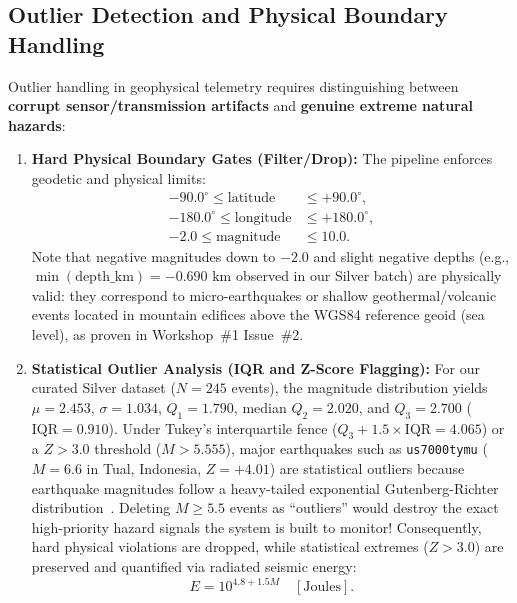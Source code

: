 \subsection{Outlier Detection and Physical Boundary Handling}
Outlier handling in geophysical telemetry requires distinguishing between \textbf{corrupt sensor/transmission artifacts} and \textbf{genuine extreme natural hazards}:
\begin{enumerate}
    \item \textbf{Hard Physical Boundary Gates (Filter/Drop):} The pipeline enforces geodetic and physical limits:
    \begin{align}
        -90.0^\circ \le \text{latitude} &\le +90.0^\circ, \\
        -180.0^\circ \le \text{longitude} &\le +180.0^\circ, \\
        -2.0 \le \text{magnitude} &\le 10.0.
    \end{align}
    Note that negative magnitudes down to $-2.0$ and slight negative depths (e.g., $\min(\text{depth\_km}) = -0.690\text{ km}$ observed in our Silver batch) are physically valid: they correspond to micro-earthquakes or shallow geothermal/volcanic events located in mountain edifices above the WGS84 reference geoid (sea level), as proven in Workshop~\#1 Issue~\#2.
    \item \textbf{Statistical Outlier Analysis (IQR and Z-Score Flagging):} For our curated Silver dataset ($N = 245$ events), the magnitude distribution yields $\mu = 2.453$, $\sigma = 1.034$, $Q_1 = 1.790$, median $Q_2 = 2.020$, and $Q_3 = 2.700$ ($\text{IQR} = 0.910$). Under Tukey's interquartile fence ($Q_3 + 1.5\times\text{IQR} = 4.065$) or a $Z > 3.0$ threshold ($M > 5.555$), major earthquakes such as \texttt{us7000tymu} ($M = 6.6$ in Tual, Indonesia, $Z = +4.01$) are statistical outliers because earthquake magnitudes follow a heavy-tailed exponential Gutenberg-Richter distribution~\cite{gutenberg1956}. Deleting $M \ge 5.5$ events as ``outliers'' would destroy the exact high-priority hazard signals the system is built to monitor! Consequently, hard physical violations are dropped, while statistical extremes ($Z > 3.0$) are preserved and quantified via radiated seismic energy:
    \begin{equation}
        E = 10^{4.8 + 1.5 M}\quad [\text{Joules}].
    \end{equation}
\end{enumerate}

